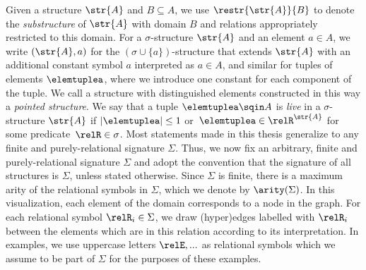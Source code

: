 Given a structure $\str{A}$ and $B \subseteq A$, we use $\restr{\str{A}}{B}$ to denote the \emph{substructure} of $\str{A}$ with domain $B$ and relations appropriately restricted to this domain.
For a $\sigma$-structure $\str{A}$ and an element $a \in A$, we write $(\str{A}, a)$ for the $(\sigma \cup \{a\})$-structure that extends $\str{A}$ with an additional constant symbol $a$ interpreted as $a \in A$, and similar for tuples of elements $\elemtuplea$, where we introduce one constant for each component of the tuple.
We call a structure with distinguished elements constructed in this way a \emph{pointed structure}.
We say that a tuple $\elemtuplea \sqin A$ is \emph{live} in a $\sigma$-structure $\str{A}$ if $|\elemtuplea| \leq 1$ or~$\elemtuplea \in \relR^{\str{A}}$ for some predicate~$\relR \in \sigma$.
Most statements made in this thesis generalize to any finite and purely-relational signature $\Sigma$.
Thus, we now fix an arbitrary, finite and purely-relational signature $\Sigma$ and adopt the convention that the signature of all structures is $\Sigma$, unless stated otherwise.
Since $\Sigma$ is finite, there is a maximum arity of the relational symbols in $\Sigma$, which we denote by $\arity(\Sigma)$.
In this visualization, each element of the domain corresponds to a node in the graph.
For each relational symbol $\relR_{i} \in \Sigma$, we draw (hyper)edges labelled with $\relR_{i}$ between the elements which are in this relation according to its interpretation.
In examples, we use uppercase letters $\relE, ...$ as relational symbols which we assume to be part of $\Sigma$ for the purposes of these examples.

